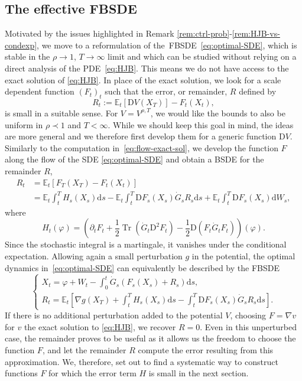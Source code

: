 \documentclass[11pt, a4paper]{scrartcl}
\numberwithin{equation}{section}
\theoremstyle{plain}
\theoremstyle{remark}
\newcommand{\assign}{:=}
\newcommand{\mathD}{\mathrm{D}}
\newcommand{\mathd}{\mathrm{d}}
\newcommand{\tmop}[1]{\ensuremath{\operatorname{#1}}}
\begin{document}
\subsection{The effective FBSDE}

Motivated by the issues highlighted in Remark
\ref{rem:ctrl-prob}-\ref{rem:HJB-vs-condexp}, we move to a reformulation of
the~FBSDE~\eqref{eq:optimal-SDE}, which is stable in the $\rho \rightarrow 1$,
$T \rightarrow \infty$ limit and which can be studied without relying on a
direct analysis of the PDE~\eqref{eq:HJB}. This means we do not have access to
the exact solution of \eqref{eq:HJB}. In place of the exact solution, we look
for a scale dependent function $(F_t)_t$ such that the error, or remainder,
$R$ defined by
\begin{equation}
  R_t \assign \mathbb{E}_t [\mathD V (X_T)] - F_t (X_t), \label{eq:Ansatz-R}
\end{equation}
is small in a suitable sense. For $V = V^{\rho, T}$, we would like the
bounds to also be uniform in $\rho \prec 1$ and $T < \infty$.
While we should keep this goal in mind, the ideas are more general and we
therefore first develop them for a generic function $\mathD V$. Similarly to the
computation in~\eqref{eq:flow-exact-sol}, we develop the function $F$ along
the flow of the SDE \eqref{eq:optimal-SDE} and obtain a BSDE for the remainder
$R$,
\begin{align*}
  R_t 
  &=\mathbb{E}_t [F_T (X_T) - F_t (X_t)] \\
  &=\mathbb{E}_t  \int_t^T H_s
   (X_s) \mathd s -\mathbb{E}_t  \int_t^T \mathD F_s (X_s)  \dot{G}_s R_s
   \mathd s +\mathbb{E}_t \int_t^T \mathD F_s (X_s) \mathd W_s,
\end{align*}
where
\begin{equation}
  H_t (\varphi) = \left( \partial_t F_t + \frac{1}{2} \tmop{Tr} (\dot{G}_t
  \mathD^2 F_t) - \frac{1}{2} \mathD (F_t  \dot{G}_t F_t) \right) (\varphi) .
  \label{eq:def-H}
\end{equation}
Since the stochastic integral is a martingale, it vanishes under the
conditional expectation. Allowing again a small perturbation $g$ in the
potential, the optimal dynamics in~\eqref{eq:optimal-SDE} can equivalently be
described by the FBSDE
\begin{equation}
  \begin{cases}
    X_t = \varphi + W_t - \int_0^t \dot{G}_s (F_s (X_s) + R_s) \mathd s,\\
    R_t =\mathbb{E}_t \left[ \nabla g (X_T) + \int_t^T H_s (X_s) \mathd s -
    \int_t^T \mathD F_s (X_s)  \dot{G}_s R_s \mathd s \right] .
  \end{cases} \label{eq:FBSDE-generic}
\end{equation}
If there is no additional perturbation added to the potential $V$, choosing $F = \nabla v$ for  $v$ the exact solution to \eqref{eq:HJB}, we
recover $R = 0$. Even in this unperturbed case, the remainder proves to be useful as it allows us the freedom to
choose the function $F$, and let the remainder $R$ compute the error resulting
from this approximation. We, therefore, set out to find a systematic way to
construct functions $F$ for which the error term $H$ is small in the next
section.
\end{document}
